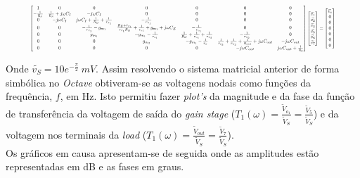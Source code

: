 \begin{equation}
\resizebox{.9\hsize}{!}
{$
\begin{bmatrix}
    1 & 0 & 0 & 0 & 0 & 0 & 0\\
    -\frac{1}{R_S} & \frac{1}{R_S} + j \omega C_I & - j \omega C_I & 0 & 0 & 0 & 0\\
    0 & - j \omega C_I & j \omega C_I + \frac{1}{R_{B}} + \frac{1}{r_{\pi_1}} & - \frac{1}{r_{\pi_1}} & 0 & 0 & 0\\
    0 & 0 & -\frac{1}{r_{\pi_1}} - g_{m_1} & \frac{R_E + r_{\pi_1}}{r_{\pi_1} R_E} + \frac{1}{r_{o1}} + g_{m_1} + j \omega C_E & - \frac{1}{r_{o_1}} & 0 & 0\\
    0 & 0 & g_{m_1} & - g_{m_1} - \frac{1}{r_{o_1}} & \frac{1}{R_C} + \frac{1}{r_{o_1}} + \frac{1}{r_{\pi_2}} & -\frac{1}{r_{\pi_2}} & 0\\
    0 & 0 & 0 & g_{m_2} & -g_{m_1} - \frac{1}{r_{\pi}} & \frac{1}{r_{o_2}} + \frac{1}{r_{\pi_2}} + \frac{1}{R_{out}} + j \omega C_{out}  & - j \omega C_{out} \\ 
    0 & 0 & 0 & 0 & 0 & -j \omega C_{out} & j \omega C_{out} + \frac{1}{R_2} \\
\end{bmatrix}
\begin{bmatrix}
  \widetilde{v_1}\\
  \widetilde{v_2}\\
  \widetilde{v_3}\\
  \widetilde{v_5}\\
  \widetilde{v_6}\\
  \widetilde{v_7}
\end{bmatrix}
=
\begin{bmatrix}
  \widetilde{v_s}\\
  0\\
  0\\
  0\\
  0\\
  0\\
  0
\end{bmatrix}
$}
\end{equation}

Onde $\widetilde{v_S} = 10 e^{-\frac{\pi}{2}} \: mV$. Assim resolvendo o sistema matricial anterior de forma simbólica no \emph{Octave}
obtiveram-se as voltagens nodais como funções da frequência, $f$, em Hz. Isto permitiu fazer \emph{plot's} da magnitude e da fase 
da função de transferência da voltagem de saída do \emph{gain stage} ($T_1(\omega) = \frac{\widetilde{V}_{o_1}}{\widetilde{V}_{S}} = \frac{\widetilde{V}_{5}}{\widetilde{V}_{S}} $)
e da voltagem nos terminais da \emph{load} ($T_1(\omega) = \frac{\widetilde{V}_{out}}{\widetilde{V}_{S}} = \frac{\widetilde{V}_{7}}{\widetilde{V}_{S}}$).
\\
Os gráficos em causa apresentam-se de seguida onde as amplitudes estão representadas em dB e as fases em graus.

